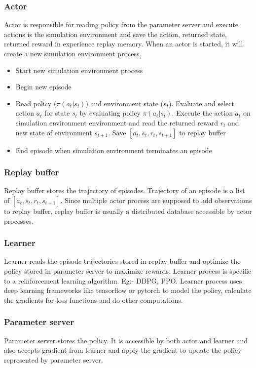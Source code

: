 \subsubsection{Actor}
Actor is responsible for reading policy from the parameter server and execute actions is the simulation environment and save the action, returned state, returned reward in experience replay memory. When an actor is started, it will create a new simulation environment process. 
\begin{itemize}
	\item Start new simulation environment process
	\item Begin new episode
	\item Read policy ($\pi(a_t|s_t)$) and environment state ($s_t$). Evaluate and select action $a_t$ for state $s_t$ by evaluating policy $\pi(a_t|s_t)$. Execute the action $a_t$ on simulation environment environment and read the returned reward $r_t$ and new state of environment $s_{t+1}$. Save $[a_t, s_t, r_t, s_{t+1}]$ to replay buffer
	\item End episode when simulation environment terminates an episode
\end{itemize}

\subsubsection{Replay buffer}
Replay buffer stores the trajectory of episodes. Trajectory of an episode is a list of $[a_t, s_t, r_t, s_{t+1}]$. Since multiple actor process are supposed to add observations to replay buffer, replay buffer is usually a distributed database accessible by actor processes. 

\subsubsection{Learner}
Learner reads the episode trajectories stored in replay buffer and optimize the policy stored in parameter server to maximize rewards. Learner process is specific to a reinforcement learning algorithm. Eg:- DDPG, PPO. Learner process uses deep learning frameworks like tensorflow or pytorch to model the policy, calculate the gradients for loss functions and do other computations.

\subsubsection{Parameter server}
Parameter server stores the policy. It is accessible by both actor and learner and also accepts gradient from learner and apply the gradient to update the policy represented by parameter server.


